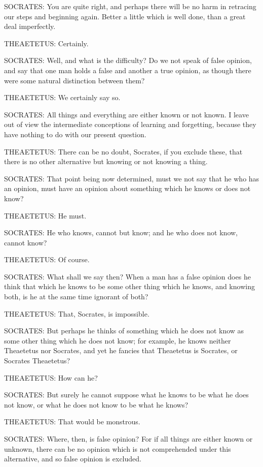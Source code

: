 SOCRATES: You are quite right, and perhaps there will be no harm in
retracing our steps and beginning again. Better a little which is well
done, than a great deal imperfectly.

THEAETETUS: Certainly.

SOCRATES: Well, and what is the difficulty? Do we not speak of false
opinion, and say that one man holds a false and another a true opinion,
as though there were some natural distinction between them?

THEAETETUS: We certainly say so.

SOCRATES: All things and everything are either known or not known.
I leave out of view the intermediate conceptions of learning and
forgetting, because they have nothing to do with our present question.

THEAETETUS: There can be no doubt, Socrates, if you exclude these, that
there is no other alternative but knowing or not knowing a thing.

SOCRATES: That point being now determined, must we not say that he who
has an opinion, must have an opinion about something which he knows or
does not know?

THEAETETUS: He must.

SOCRATES: He who knows, cannot but know; and he who does not know,
cannot know?

THEAETETUS: Of course.

SOCRATES: What shall we say then? When a man has a false opinion does
he think that which he knows to be some other thing which he knows, and
knowing both, is he at the same time ignorant of both?

THEAETETUS: That, Socrates, is impossible.

SOCRATES: But perhaps he thinks of something which he does not know as
some other thing which he does not know; for example, he knows neither
Theaetetus nor Socrates, and yet he fancies that Theaetetus is Socrates,
or Socrates Theaetetus?

THEAETETUS: How can he?

SOCRATES: But surely he cannot suppose what he knows to be what he does
not know, or what he does not know to be what he knows?

THEAETETUS: That would be monstrous.

SOCRATES: Where, then, is false opinion? For if all things are either
known or unknown, there can be no opinion which is not comprehended
under this alternative, and so false opinion is excluded.

